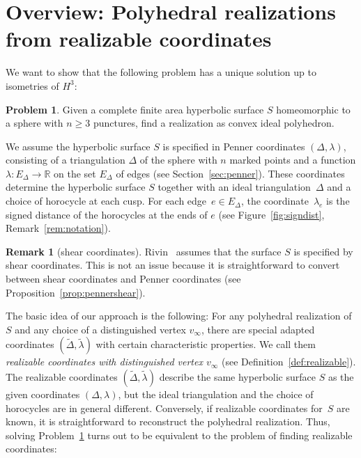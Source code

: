 \documentclass[a4paper, 11pt]{article}
\newcommand{\R}{\mathbb{R}}
\newcommand{\Deltil}{\widetilde{\Delta}}
\newcommand{\lamtil}{\tilde{\lambda}}
\theoremstyle{plain}
\theoremstyle{definition}
\newtheorem{problem}[theorem]{Problem}
\newtheorem{remark}[theorem]{Remark}
\begin{document}
\section{Overview: Polyhedral realizations from realizable
  coordinates}
\label{sec:overview}

We want to show that the following problem has a unique solution
up to isometries of $H^{3}$:

\begin{problem}
  \label{prob:realize1}
  Given a complete finite area hyperbolic surface $S$ homeomorphic to
  a sphere with $n\geq 3$ punctures, find a realization as convex
  ideal polyhedron.
\end{problem}

We assume the hyperbolic surface $S$ is specified in Penner
coordinates $(\Delta,\lambda)$, consisting of a triangulation $\Delta$
of the sphere with $n$ marked points and a function
$\lambda:E_{\Delta}\rightarrow\R$ on the set $E_{\Delta}$ of edges
(see Section~\ref{sec:penner}). These coordinates determine the
hyperbolic surface $S$ together with an ideal triangulation~$\Delta$
and a choice of horocycle at each cusp.  For each
edge~$e\in E_{\Delta}$, the coordinate~$\lambda_{e}$ is the signed
distance of the horocycles at the ends of $e$ (see
Figure~\ref{fig:signdist}, Remark~\ref{rem:notation}).

\begin{remark}[shear coordinates]
  Rivin~\cite{rivin94:_intrin} assumes that the surface $S$ is
  specified by shear coordinates. This is not an issue because it is
  straightforward to convert between shear coordinates and Penner
  coordinates (see Proposition~\ref{prop:pennershear}).
\end{remark}

The basic idea of our approach is the following: For any polyhedral
realization of $S$ and any choice of a distinguished vertex
$v_{\infty}$, there are special adapted coordinates
$(\Deltil,\lamtil)$ with certain characteristic properties. We call
them \emph{realizable coordinates with distinguished vertex
  $v_{\infty}$} (see Definition~\ref{def:realizable}). The realizable
coordinates $(\Deltil,\lamtil)$ describe the same hyperbolic surface
$S$ as the given coordinates $(\Delta,\lambda)$, but the ideal
triangulation and the choice of horocycles are in general
different. Conversely, if realizable coordinates for~$S$ are known, it
is straightforward to reconstruct the polyhedral realization. Thus,
solving Problem~\ref{prob:realize1} turns out to be equivalent to the
problem of finding realizable coordinates:
\end{document}
